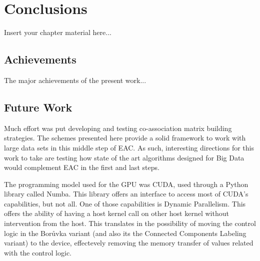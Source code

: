 
\chapter{Conclusions}
\label{chapter:conclusions}

Insert your chapter material here...


\section{Achievements}
\label{section:achievements}

The major achievements of the present work...


\section{Future Work}
\label{section:future}


Much effort was put developing and testing co-association matrix building strategies.
The schemes presented here provide a solid framework to work with large data sets in this middle step of EAC.
As such, interesting directions for this work to take are testing how state of the art algorithms designed for Big Data would complement EAC in the first and last steps.

The programming model used for the GPU was CUDA, used through a Python library called Numba.
This library offers an interface to access most of CUDA's capabilities, but not all.
One of those capabilities is Dynamic Parallelism.
This offers the ability of having a host kernel call on other host kernel without intervention from the host.
This translates in the possibility of moving the control logic in the Borůvka variant (and also its the Connected Components Labeling variant) to the device, effectevely removing the memory transfer of values related with the control logic.

